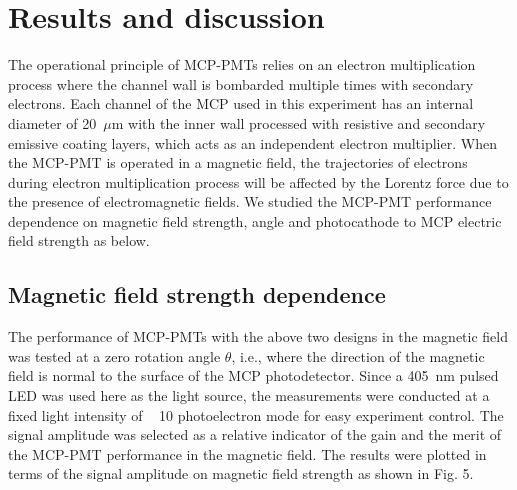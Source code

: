 ﻿\documentclass[preprint,5p]{elsarticle}
\begin{document}
\section{Results and discussion} \label{}
The operational principle of MCP-PMTs relies on an electron multiplication process 
where the channel wall is bombarded multiple times with secondary electrons. Each 
channel of the MCP used in this experiment has an internal diameter of 
20~$\mu$m with the inner wall processed with resistive and secondary emissive 
coating layers, which acts as an independent electron multiplier. When the MCP-PMT is 
operated in a magnetic field, the trajectories of electrons during electron 
multiplication process will be affected by the Lorentz force due to the 
presence of electromagnetic fields. We studied the MCP-PMT performance 
dependence on magnetic field strength, angle and photocathode to MCP electric 
field strength as below. 

\subsection{Magnetic field strength dependence} \label{}
The performance of MCP-PMTs with the above two designs in the magnetic field 
was tested at a zero rotation angle $\theta$, i.e., where the direction of the 
magnetic field is normal to the surface of the MCP photodetector. Since a 
405~nm pulsed LED was used here as the light source, the measurements were 
conducted at a fixed light intensity of ~ 10 photoelectron mode for easy 
experiment control.  The signal amplitude was selected as a relative indicator 
of the gain and the merit of the MCP-PMT performance in the magnetic field.  
The results were plotted in terms of the signal amplitude on magnetic field 
strength as shown in Fig. 5. 
\end{document}
